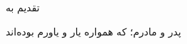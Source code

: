 \vspace*{\fill}
\begin{center}
\large\nastaliq
تقدیم به

پدر و مادرم؛ که همواره یار و یاورم بوده‌اند
\end{center}
\vfill
\newpage